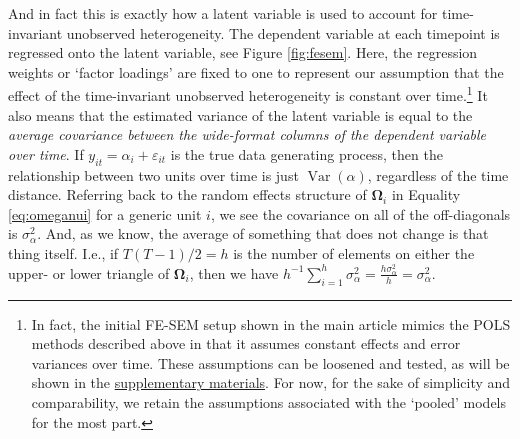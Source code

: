 \documentclass[]{interact}
\theoremstyle{plain}%
\theoremstyle{definition}
\theoremstyle{remark}
\begin{document}
And in fact this is exactly how a latent variable is used to account for
time-invariant unobserved heterogeneity. The dependent variable at each
timepoint is regressed onto the latent variable, see Figure
\ref{fig:fesem}. Here, the regression weights or `factor loadings' are
fixed to one to represent our assumption that the effect of the
time-invariant unobserved heterogeneity is constant over time.\footnote{In
  fact, the initial FE-SEM setup shown in the main article mimics the
  POLS methods described above in that it assumes constant effects and
  error variances over time. These assumptions can be loosened and
  tested, as will be shown in the
  \href{https://github.com/henrik-andersen/FE-SEM/blob/master/extensions.pdf}{supplementary
  materials}. For now, for the sake of simplicity and comparability, we
  retain the assumptions associated with the `pooled' models for the
  most part.} It also means that the estimated variance of the latent
variable is equal to the
\textit{average covariance between the wide-format columns of the dependent variable over time}.
If \(y_{it} = \alpha_{i} + \varepsilon_{it}\) is the true data
generating process, then the relationship between two units over time is
just \(\mathop{\mathrm{\mathrm{Var}}}(\alpha)\), regardless of the time
distance. Referring back to the random effects structure of
\(\bm{\Omega}_{i}\) in Equality \eqref{eq:omeganui} for a generic unit
\(i\), we see the covariance on all of the off-diagonals is
\(\sigma^{2}_{\alpha}\). And, as we know, the average of something that
does not change is that thing itself. I.e., if \(T(T-1)/2 = h\) is the
number of elements on either the upper- or lower triangle of
\(\bm{\Omega}_{i}\), then we have
\(h^{-1}\sum_{i=1}^{h}\sigma^{2}_{\alpha} = \frac{h \sigma^{2}_{\alpha}}{h} = \sigma^{2}_{\alpha}\).
\end{document}
